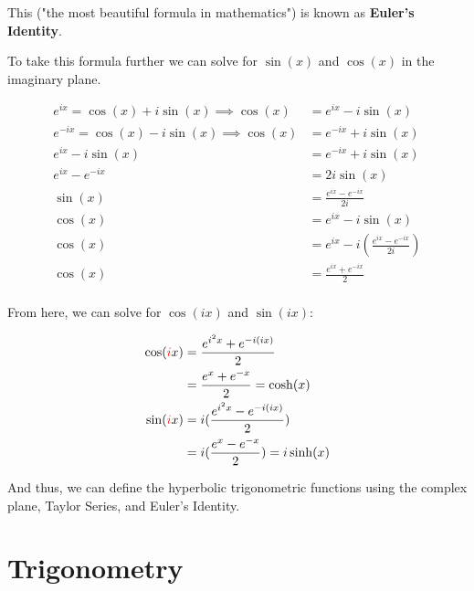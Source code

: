 \documentclass[12pt]{article}
\begin{document}
This ("the most beautiful formula in mathematics") is known as \textbf{Euler's Identity}.

To take this formula further we can solve for $\sin(x)$ and $\cos(x)$ in the imaginary plane. 

\begin{equation}
    \begin{split}
        e^{ix} = \cos(x) + i\sin(x) \implies \cos(x) &= e^{ix} - i\sin(x)\\
        e^{-ix} = \cos(x) - i\sin(x) \implies \cos(x) &= e^{-ix} +i\sin(x)\\
        e^{ix} - i\sin(x) &= e^{-ix} + i\sin(x)\\
        e^{ix}-e^{-ix} &= 2i\sin(x)\\
        \sin(x) &= \frac{e^{ix}-e^{-ix}}{2i}\\
        \cos(x) &= e^{ix}-i\sin(x)\\
        \cos(x) &=e^{ix}-i(\frac{e^{ix}-e^{-ix}}{2i})\\
        \cos(x) &= \frac{e^{ix}+e^{-ix}}{2}\\
    \end{split}
\end{equation}

From here, we can solve for $\cos(ix)$ and $\sin(ix)$:


\begin{equation}
    \begin{split}
        \cos(\textcolor{red}{i}x) &= \frac{e^{i^2 x}+e^{-i(ix)}}{2}\\
        &= \frac{e^x+e^{-x}}{2} = \cosh(x)\\
        \sin(\textcolor{red}{i} x) &= i(\frac{e^{i^2 x}-e^{-i(ix)}}{2})\\
        &= i(\frac{e^x-e^{-x}}{2}) = i \sinh(x)\\
    \end{split}
\end{equation}

And thus, we can define the hyperbolic trigonometric functions using the complex plane, Taylor Series, and Euler's Identity. 

\section{Trigonometry}
\end{document}
